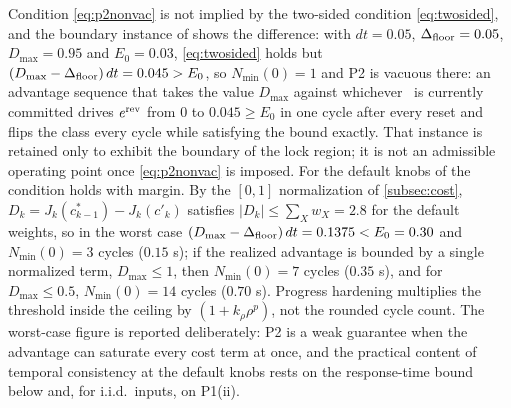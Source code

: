\begin{remark} \label{rem:p2nonvac}
Condition \eqref{eq:p2nonvac} is not implied by the two-sided condition \eqref{eq:twosided}, and the boundary instance of  shows the difference: with $dt = 0.05$, $\Delta_{\text{floor}} = 0.05$, $D_{\max} = 0.95$ and $E_0 = 0.03$, \eqref{eq:twosided} holds but $(D_{\max}-\Delta_{\text{floor}})\,dt = 0.045 > E_0$, so $N_{\min}(0) = 1$ and P2 is vacuous there: an advantage sequence that takes the value $D_{\max}$ against whichever \Class\ is currently committed drives $e^{\text{rev}}$ from $0$ to $0.045 \ge E_0$ in one cycle after every reset and flips the class every cycle while satisfying the bound exactly. That instance is retained only to exhibit the boundary of the lock region; it is not an admissible operating point once \eqref{eq:p2nonvac} is imposed. For the default knobs of  the condition holds with margin. By the $[0,1]$ normalization of \cref{subsec:cost}, $D_k = J_k(c^*_{k-1}) - J_k(c'_k)$ satisfies $|D_k| \le \sum_X w_X = 2.8$ for the default weights, so in the worst case $(D_{\max}-\Delta_{\text{floor}})\,dt = 0.1375 < E_0 = 0.30$ and $N_{\min}(0) = 3$ cycles ($0.15$ s); if the realized advantage is bounded by a single normalized term, $D_{\max} \le 1$, then $N_{\min}(0) = 7$ cycles ($0.35$ s), and for $D_{\max} \le 0.5$, $N_{\min}(0) = 14$ cycles ($0.70$ s). Progress hardening multiplies the threshold inside the ceiling by $(1 + k_\rho \rho^p)$, not the rounded cycle count. The worst-case figure is reported deliberately: P2 is a weak guarantee when the advantage can saturate every cost term at once, and the practical content of temporal consistency at the default knobs rests on the response-time bound below and, for i.i.d.\ inputs, on P1(ii).
\end{remark}


